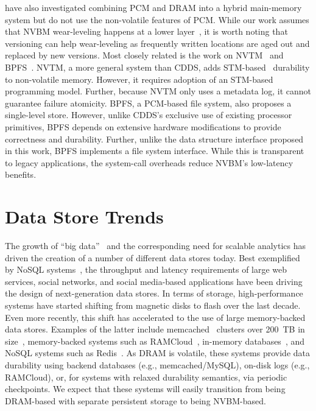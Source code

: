 \citet{Qureshi09b} have also investigated combining PCM and DRAM into
a hybrid main-memory system but do not use the non-volatile features
of PCM\@.  While our work assumes that NVBM wear-leveling happens at a
lower layer~\citep{Zhou09}, it is worth noting that versioning can
help wear-leveling as frequently written locations are aged out and
replaced by new versions.  Most closely related is the work on
NVTM~\citep{Coburn09} and BPFS~\citep{Condit09}.  NVTM, a more general
system than CDDS, adds STM-based~\citep{Shavit95} durability to
non-volatile memory.  However, it requires adoption of an STM-based
programming model.  Further, because NVTM only uses a metadata log, it
cannot guarantee failure atomicity.  BPFS, a PCM-based file system,
also proposes a single-level store.  However, unlike CDDS's exclusive
use of existing processor primitives, BPFS depends on extensive hardware
modifications to provide correctness and durability.  Further, unlike
the data structure interface proposed in this work, BPFS implements a
file system interface.  While this is transparent to legacy
applications, the system-call overheads reduce NVBM's low-latency
benefits.


\section{Data Store Trends}

The growth of ``big data''~\citep{EconomistData} and the corresponding
need for scalable analytics has driven the creation of a number of
different data stores today.  Best exemplified by NoSQL
systems~\citep{Cattell10}, the throughput and latency requirements of
large web services, social networks, and social media-based
applications have been driving the design of next-generation data
stores.  In terms of storage, high-performance systems have started
shifting from magnetic disks to flash over the last decade.  Even more
recently, this shift has accelerated to the use of large memory-backed
data stores.  Examples of the latter include
memcached~\citep{Fitzpatrick04} clusters over 200~TB in
size~\citep{Kwiatkowski10}, memory-backed systems such as
RAMCloud~\citep{Ousterhout09}, in-memory
databases~\citep{Stonebraker07,VoltDB}, and NoSQL systems such as
Redis~\citep{Redis}.  As DRAM is volatile, these systems provide data
durability using backend databases (e.g., memcached/MySQL), on-disk
logs (e.g., RAMCloud), or, for systems with relaxed durability
semantics, via periodic checkpoints.  We expect that these systems
will easily transition from being DRAM-based with separate persistent
storage to being NVBM-based.



